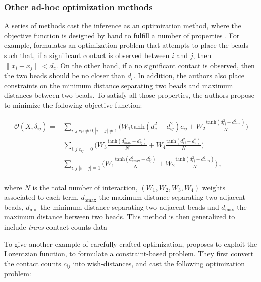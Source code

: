 \documentclass[2columns]{article}
\begin{document}
\subsubsection*{Other ad-hoc optimization methods}

A series of methods cast the inference as an optimization method, where the
objective function is designed by hand to fulfill a number of properties
\citep{trieu:large, trieu:MOGEN, trieu:3D}. For example, \citep{trieu:large}
formulates an optimization problem that attempts to place the beads such that,
if a significant contact is observed between $i$ and $j$, then $\| x_i - x_j
\| < d_c$. On the other hand, if a no significant contact is observed, then
the two beads should be no closer than $d_c$. In addition, the authors also
place constraints on the minimum distance separating two beads and maximum
distances between two beads. To satisfy all those properties, the authors
propose to minimize the following objective function:

\begin{equation*}
\begin{aligned}
\mathcal{O}(X, \delta_{ij}) = & \underset{i, j | c_{ij} \neq 0, |i-j| \neq 1}{\sum} \Bigg(W_1 \text{tanh}(d^2_c -
d^2_{ij}) c_{ij} + W_2 \frac{\text{tanh}(d^2_{ij} - d^2_\text{min})}{N} \Bigg) \\
& \underset{i, j | c_{ij} = 0}{\sum} \Bigg(W_3 \frac{\text{tanh}(d^2_\text{max} -
d^2_{ij})}{N} + W_4 \frac{\text{tanh}(d^2_{ij} -
d^2_{c})}{N}\Bigg) \\
& \underset{i, j | |i - j| = 1}{\sum} \Bigg(W_1 \frac{\text{tanh}(d^2_\text{amax} -
d^2_{ij})}{N} + W_2 \frac{\text{tanh}(d^2_{ij} -
d^2_\text{min})}{N}\Bigg) \,,\\
\end{aligned}
\end{equation*}

where $N$ is the total number of interaction, $(W_1, W_2, W_3, W_4)$ weights
associated to each term, $d_\text{amax}$ the maximum distance separating two
adjacent beads, $d_\text{min}$ the minimum distance separating two adjacent
beads and $d_\text{max}$ the maximum distance between two beads. 
This method is then generalized to include \textit{trans} contact counts data
\citep{trieu:MOGEN}

To give another example of carefully crafted optimization, \cite{trieu:3D}
proposes to exploit the Lozentzian function, to formulate a constraint-based
problem. They first convert the contact counts $c_{ij}$ into wish-distances,
and cast the following optimization problem:
\end{document}
